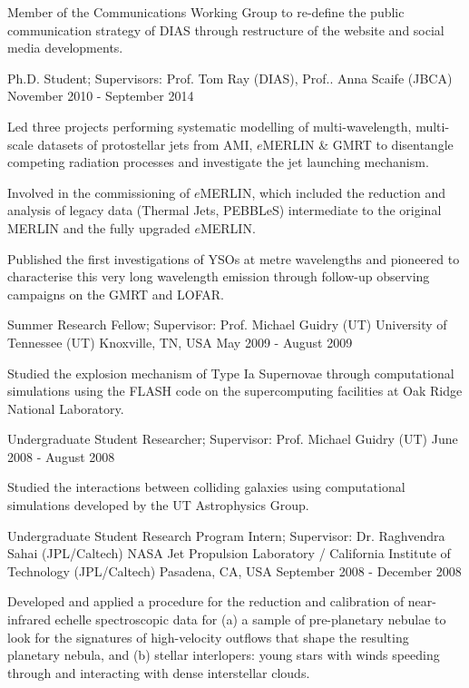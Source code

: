 \begin{cventries}
{\begin{cvitems}
        \item {Member of the Communications Working Group to re-define the public communication strategy of DIAS through restructure of the website and social media developments.}
      \end{cvitems}
    }
  \cventry
    {Ph.D. Student; Supervisors: Prof. Tom Ray (DIAS), Prof.. Anna Scaife (JBCA)}
    {}
    {}
    {November 2010 - September 2014}
    {
      \begin{cvitems}
        \item {Led three projects performing systematic modelling of multi-wavelength, multi-scale datasets of protostellar jets from AMI, $e$MERLIN \& GMRT to disentangle competing radiation processes and investigate the jet launching mechanism.}
        \item {Involved in the commissioning of $e$MERLIN, which included the reduction and analysis of legacy data (Thermal Jets, PEBBLeS) intermediate to the original MERLIN and the fully upgraded $e$MERLIN.}
        \item {Published the first investigations of YSOs at metre wavelengths and pioneered to characterise this very long wavelength emission through follow-up observing campaigns on the GMRT and LOFAR.}
      \end{cvitems} 
    }
\cventry
    {Summer Research Fellow; Supervisor: Prof. Michael Guidry (UT)}
    {University of Tennessee (UT)}
    {Knoxville, TN, USA}
    {May 2009 - August 2009}
    {
      \begin{cvitems}
        \item {Studied the explosion mechanism of Type Ia Supernovae through computational simulations using the FLASH code on the supercomputing facilities at Oak Ridge National Laboratory.}
      \end{cvitems}
    }
\cventry
    {Undergraduate Student Researcher; Supervisor: Prof. Michael Guidry (UT)}
    {}
    {}
    {June 2008 - August 2008}
    {
      \begin{cvitems}
        \item {Studied the interactions between colliding galaxies using computational simulations developed by the UT Astrophysics Group.}
      \end{cvitems}
    }
\cventry
    {Undergraduate Student Research Program Intern; Supervisor: Dr. Raghvendra Sahai (JPL/Caltech)}
    {NASA Jet Propulsion Laboratory / California Institute of Technology (JPL/Caltech)}
    {Pasadena, CA, USA}
    {September 2008 - December 2008}
    {
      \begin{cvitems}
        \item {Developed and applied a procedure for the reduction and calibration of near-infrared echelle spectroscopic data for (a)  a sample of pre-planetary nebulae to look for the signatures of high-velocity outflows that shape the resulting planetary nebula, and (b) stellar interlopers: young stars with winds speeding through and interacting with dense interstellar clouds.}
      \end{cvitems}
    }
\end{cventries}
